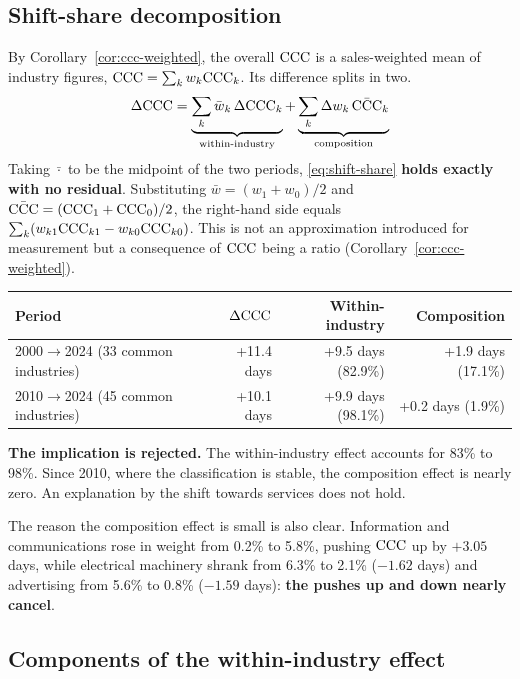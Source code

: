 \subsection{Shift-share decomposition}

By Corollary~\ref{cor:ccc-weighted}, the overall $\mathrm{CCC}$ is a sales-weighted mean of industry
figures, $\mathrm{CCC}=\sum_k w_k\mathrm{CCC}_k$. Its difference splits in two.
\begin{equation}
\Delta\CCC = \underbrace{\sum_k \bar{w}_k\,\Delta\CCC_k}_{\text{within-industry}}
 + \underbrace{\sum_k \Delta w_k\,\bar{\CCC}_k}_{\text{composition}}
\label{eq:shift-share}
\end{equation}
Taking $\bar{\cdot}$ to be the midpoint of the two periods,
\eqref{eq:shift-share} \textbf{holds exactly with no residual}. Substituting
$\bar w=(w_1+w_0)/2$ and $\bar\CCC=(\CCC_1+\CCC_0)/2$, the right-hand side equals
$\sum_k(w_{k1}\mathrm{CCC}_{k1}-w_{k0}\mathrm{CCC}_{k0})$. This is not an approximation introduced for
measurement but a consequence of $\mathrm{CCC}$ being a ratio
(Corollary~\ref{cor:ccc-weighted}).

\begin{center}
\begin{tabular}{@{}lrrr@{}}
\toprule
Period & $\Delta\mathrm{CCC}$ & Within-industry & Composition \\
\midrule
2000$\to$2024 (33 common industries) & +11.4 days & +9.5 days (82.9\%) & +1.9 days (17.1\%) \\
2010$\to$2024 (45 common industries) & +10.1 days & +9.9 days (98.1\%) & +0.2 days (1.9\%) \\
\bottomrule
\end{tabular}
\label{tab:shift-share-decomposition}
\end{center}

\textbf{The implication is rejected.} The within-industry effect accounts for 83\% to 98\%.
Since 2010, where the classification is stable, the composition effect is nearly zero. An
explanation by the shift towards services does not hold.

The reason the composition effect is small is also clear. Information and communications rose
in weight from 0.2\% to 5.8\%, pushing $\mathrm{CCC}$ up by $+3.05$ days, while electrical machinery
shrank from 6.3\% to 2.1\% ($-1.62$ days) and advertising from 5.6\% to 0.8\% ($-1.59$ days):
\textbf{the pushes up and down nearly cancel}.

\subsection{Components of the within-industry effect}

